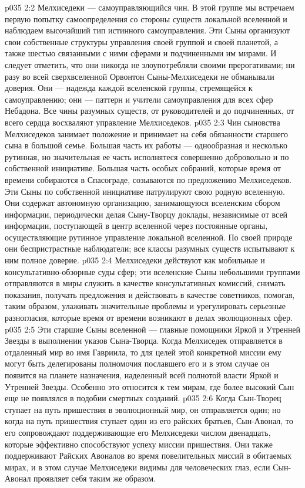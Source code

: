 \vs p035 2:2 Мелхиседеки --- самоуправляющийся чин. В этой группе мы встречаем первую попытку самоопределения со стороны существ локальной вселенной и наблюдаем высочайший тип истинного самоуправления. Эти Сыны организуют свои собственные структуры управления своей группой и своей планетой, а также шестью связанными с ними сферами и подчиненными им мирами. И следует отметить, что они никогда не злоупотребляли своими прерогативами; ни разу во всей сверхвселенной Орвонтон Сыны\hyp{}Мелхиседеки не обманывали доверия. Они --- надежда каждой вселенской группы, стремящейся к самоуправлению; они --- паттерн и учители самоуправления для всех сфер Небадона. Все чины разумных существ, от руководителей и до подчиненных, от всего сердца восхваляют управление Мелхиседеков.
\vs p035 2:3 \pc Чин сыновства Мелхиседеков занимает положение и принимает на себя обязанности старшего сына в большой семье. Большая часть их работы --- однообразная и несколько рутинная, но значительная ее часть исполнятеся совершенно добровольно и по собственной инициативе. Большая часть особых собраний, которые время от времени собираются в Спасограде, созываются по предложению Мелхиседеков. Эти Сыны по собственной инициативе патрулируют свою родную вселенную. Они содержат автономную организацию, занимающуюся вселенским сбором информации, периодически делая Сыну\hyp{}Творцу доклады, независимые от всей информации, поступающей в центр вселенной через постоянные органы, осуществляющие рутинное управление локальной вселенной. По своей природе они беспристрастные наблюдатели; все классы разумных существ испытывают к ним полное доверие.
\vs p035 2:4 Мелхиседеки действуют как мобильные и консультативно\hyp{}обзорные суды сфер; эти вселенские Сыны небольшими группами отправляются в миры служить в качестве консультативных комиссий, снимать показания, получать предложения и действовать в качестве советников, помогая, таким образом, улаживать значительные проблемы и урегулировать серьезные разногласия, которые время от времени возникают в делах эволюционных сфер.
\vs p035 2:5 Эти старшие Сыны вселенной --- главные помощники Яркой и Утренней Звезды в выполнении указов Сына\hyp{}Творца. Когда Мелхиседек отправляется в отдаленный мир во имя Гавриила, то для целей этой конкретной миссии ему могут быть делегированы полномочия пославшего его и в этом случае он появится на планете назначения, наделенный всей полнотой власти Яркой и Утренней Звезды. Особенно это относится к тем мирам, где более высокий Сын еще не появлялся в подобии смертных созданий.
\vs p035 2:6 Когда Сын\hyp{}Творец ступает на путь пришествия в эволюционный мир, он отправляется один; но когда на путь пришествия ступает один из его райских братьев, Сын\hyp{}Авонал, то его сопровождают поддерживающие его Мелхиседеки числом двенадцать, которые эффективно способствуют успеху миссии пришествия. Они также поддерживают Райских Авоналов во время повелительных миссий в обитаемых мирах, и в этом случае Мелхиседеки видимы для человеческих глаз, если Сын\hyp{}Авонал проявляет себя таким же образом.
